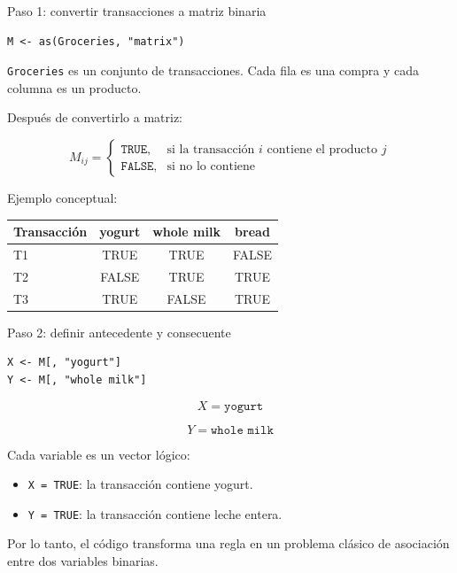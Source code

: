 \documentclass[10pt,aspectratio=169]{beamer}
\begin{document}
\begin{frame}[fragile]{Paso 1: convertir transacciones a matriz binaria}
\begin{lstlisting}[style=Rstyle]
M <- as(Groceries, "matrix")
\end{lstlisting}

\vspace{0.3cm}
\texttt{Groceries} es un conjunto de transacciones. Cada fila es una compra y cada columna es un producto.

\vspace{0.3cm}
Después de convertirlo a matriz:

\[
M_{ij} =
\begin{cases}
\texttt{TRUE}, & \text{si la transacción } i \text{ contiene el producto } j \\
\texttt{FALSE}, & \text{si no lo contiene}
\end{cases}
\]

\vspace{0.3cm}
Ejemplo conceptual:

\begin{center}
\begin{tabular}{lccc}
\toprule
Transacción & yogurt & whole milk & bread \\
\midrule
T1 & TRUE  & TRUE  & FALSE \\
T2 & FALSE & TRUE  & TRUE \\
T3 & TRUE  & FALSE & TRUE \\
\bottomrule
\end{tabular}
\end{center}
\end{frame}

\begin{frame}[fragile]{Paso 2: definir antecedente y consecuente}
\begin{lstlisting}[style=Rstyle]
X <- M[, "yogurt"]
Y <- M[, "whole milk"]
\end{lstlisting}

\vspace{0.4cm}
\Large
\[
X = \texttt{yogurt}
\]

\[
Y = \texttt{whole milk}
\]

\vspace{0.3cm}
\normalsize
Cada variable es un vector lógico:

\begin{itemize}
  \item \texttt{X = TRUE}: la transacción contiene yogurt.
  \item \texttt{Y = TRUE}: la transacción contiene leche entera.
\end{itemize}

\vspace{0.3cm}
Por lo tanto, el código transforma una regla en un problema clásico de asociación entre dos variables binarias.
\end{frame}
\end{document}
